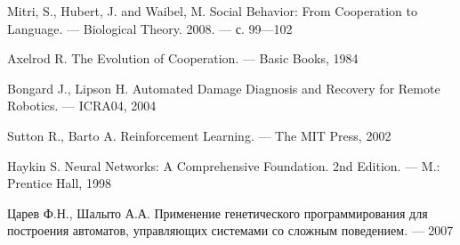 \documentclass[a4paper,14pt]{extarticle}
\begin{document}
\renewcommand*{\refname}{}
\begin{thebibliography}{}

    Mitri, S., Hubert, J. and Waibel, M. Social Behavior: From Cooperation to
    Language. — Biological Theory. 2008. — с. 99—102

    Axelrod R. The Evolution of Cooperation. — Basic Books, 1984

    Bongard J., Lipson H. Automated Damage Diagnosis and Recovery for Remote
    Robotics. — ICRA04, 2004

    Sutton R., Barto A. Reinforcement Learning. — The MIT Press, 2002

    Haykin S. Neural Networks: A Comprehensive Foundation. 2nd Edition. — M.: Prentice Hall, 1998

    Царев Ф.Н., Шалыто А.А. Применение генетического программирования для
    построения автоматов, управляющих системами со сложным поведением. — 2007

\end{thebibliography}
\end{document}
